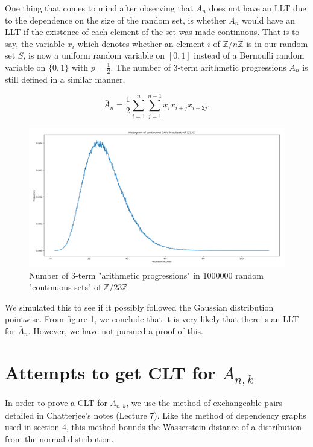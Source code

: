 \documentclass[12pt]{article} %
\newcommand{\Z}{\mathbb{Z}}
\theoremstyle{definition}
\theoremstyle{definition}
\begin{document}
One thing that comes to mind after observing that $A_n$ does not have an LLT due to the dependence on the size of the random set, is whether $A_n$ would have an LLT if the existence of each element of the set was made continuous. That is to say, the variable $x_i$ which denotes whether an element $i$ of $\Z / n\Z$ is in our random set $S$, is now a uniform random variable on $[0, 1]$ instead of a Bernoulli random variable on $\{0, 1\}$ with $p=\frac{1}{2}$. The number of 3-term arithmetic progressions $\bar{A}_n$ is still defined in a similar manner,

$$ \bar{A}_n = \frac{1}{2}\sum_{i = 1}^{n} {\sum_{j = 1}^{n-1} {x_i x_{i+j} x_{i+2j}}}. $$

\begin{figure}[t]
	\centering
    \includegraphics[width=\textwidth]{3ap-cont}
    \caption{Number of 3-term "arithmetic progressions" in 1000000 random "continuous sets" of $\Z / 23\Z$} %
    \label{fig:3ap-cont}
\end{figure}

We simulated this to see if it possibly followed the Gaussian distribution pointwise. From figure \ref{fig:3ap-cont}, we conclude that it is very likely that there is an LLT for $\bar{A}_n$. However, we have not pursued a proof of this.

\section{Attempts to get CLT for $A_{n,k}$}

In order to prove a CLT for $A_{n,k}$, we use the method of exchangeable pairs detailed in Chatterjee's notes \cite{Chatterjee07} (Lecture 7). Like the method of dependency graphs used in section 4, this method bounds the Wasserstein distance of a distribution from the normal distribution. 
\end{document}
